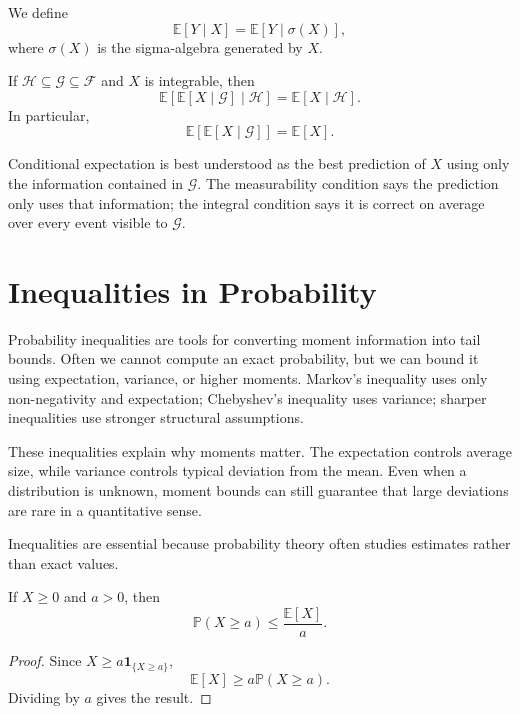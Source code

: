 \begin{definition}
We define
\[
    \mathbb{E}[Y\mid X]=\mathbb{E}[Y\mid\sigma(X)],
\]
where $\sigma(X)$ is the sigma-algebra generated by $X$.
\end{definition}

\begin{theorem}
If $\mathcal{H}\subseteq\mathcal{G}\subseteq\mathcal{F}$ and $X$ is integrable, then
\[
    \mathbb{E}[\mathbb{E}[X\mid\mathcal{G}]\mid\mathcal{H}]=\mathbb{E}[X\mid\mathcal{H}].
\]
In particular,
\[
    \mathbb{E}[\mathbb{E}[X\mid\mathcal{G}]]=\mathbb{E}[X].
\]
\end{theorem}

\begin{remark}
Conditional expectation is best understood as the best prediction of $X$ using only the information contained in $\mathcal{G}$. The measurability condition says the prediction only uses that information; the integral condition says it is correct on average over every event visible to $\mathcal{G}$.
\end{remark}

\section{Inequalities in Probability}


Probability inequalities are tools for converting moment information into tail bounds. Often we cannot compute an exact probability, but we can bound it using expectation, variance, or higher moments. Markov's inequality uses only non-negativity and expectation; Chebyshev's inequality uses variance; sharper inequalities use stronger structural assumptions.

These inequalities explain why moments matter. The expectation controls average size, while variance controls typical deviation from the mean. Even when a distribution is unknown, moment bounds can still guarantee that large deviations are rare in a quantitative sense.

Inequalities are essential because probability theory often studies estimates rather than exact values.

\begin{theorem}
If $X\geq 0$ and $a>0$, then
\[
    \mathbb{P}(X\geq a)\leq \frac{\mathbb{E}[X]}{a}.
\]
\end{theorem}

\begin{proof}
Since $X\geq a\mathbf{1}_{\{X\geq a\}}$,
\[
    \mathbb{E}[X]\geq a\mathbb{P}(X\geq a).
\]
Dividing by $a$ gives the result.
\end{proof}

